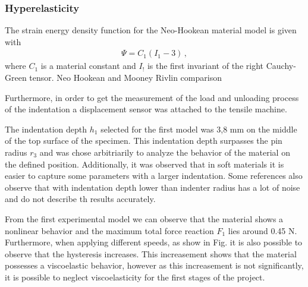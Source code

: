\subsubsection{Hyperelasticity}
The strain energy density function for the Neo-Hookean material model is given with
\begin{align*}
            \Psi = C_1 (I_1 - 3) \, ,
\end{align*}
where $C_1$ is a material constant and $I_!$ is the first invariant of the right Cauchy-Green tensor. 
Neo Hookean and Mooney Rivlin comparison






Furthermore, in order to get the measurement of the load and 
 unloading process of
 the indentation a displacement sensor was attached to the tensile machine.

 The indentation depth \(h_1\) selected for the first model was 3,8 mm on the middle of the 
 top surface of the specimen. This indentation depth surpasses the pin radius \(r_3\) and 
 was chose arbitriarily to analyze the behavior of the material on the defined position.
 Additionally, it was observed that in soft materials it is easier to capture 
 some parameters with a larger indentation. Some references also observe that with
 indentation depth lower than indenter radius has a lot of noise and do not describe
 th results accurately. %

 From the first experimental model we can observe that the material shows a nonlinear 
 behavior and the maximum total force reaction \(F_1\) lies around 0.45 N. %
 Furthermore, when applying different speeds, as show in Fig. %
 it is also possible to observe that 
 the hysteresis increases. %
This increasement shows that the material possesses a viscoelastic behavior, however
as this increasement is not significantly, it is possible to neglect viscoelasticity for 
the first stages of the project.


